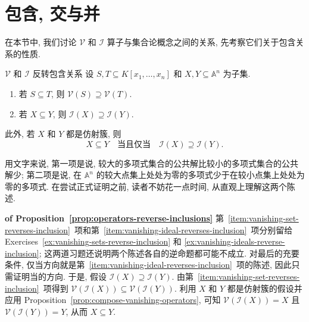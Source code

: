 \section{包含, 交与并}\label{sec:inclusions-intersections-unions}

在本节中, 我们讨论 $\mathcal{V}$ 和 $\mathcal{I}$ 算子与集合论概念之间的关系, 先考察它们关于包含关系的性质.

\begin{Proposition}{$\mathcal{V}$ 和 $\mathcal{I}$ 反转包含关系}\leavevmode\label{prop:operators-reverse-inclusions}
  设 $S,T\subseteq K[x_{1},\ldots,x_{n}]$ 和 $X,Y\subseteq\mathbb{A}^{n}$ 为子集.
  \begin{enumerate}[label=\arabic*.,ref=\arabic*]
    \item\label{item:vanishing-set-reverses-inclusion} 若 $S\subseteq T$, 则 $\mathcal{V}(S)\supseteq\mathcal{V}(T)$.
    \item\label{item:vanishing-ideal-reverses-inclusion} 若 $X\subseteq Y$, 则 $\mathcal{I}(X)\supseteq\mathcal{I}(Y)$.
  \end{enumerate}
  此外, 若 $X$ 和 $Y$ 都是仿射簇, 则
  \[
    X\subseteq Y \quad\text{当且仅当}\quad \mathcal{I}(X)\supseteq\mathcal{I}(Y).
  \]
\end{Proposition}

用文字来说, 第一项是说, 较大的多项式集合的公共解比较小的多项式集合的公共解少; 第二项是说, 在 $\mathbb{A}^{n}$ 的较大点集上处处为零的多项式少于在较小点集上处处为零的多项式. 在尝试正式证明之前, 读者不妨花一点时间, 从直观上理解这两个陈述.

\begin{Proof}\unskip\textbf{ of Proposition~\ref{prop:operators-reverse-inclusions}}\quad
  第~\ref{item:vanishing-set-reverses-inclusion}~项和第~\ref{item:vanishing-ideal-reverses-inclusion}~项分别留给 Exercises~\ref{ex:vanishing-sets-reverse-inclusion} 和 \ref{ex:vanishing-ideals-reverse-inclusion}; 这两道习题还说明两个陈述各自的逆命题都可能不成立. 对最后的充要条件, \textquotedbl{}仅当\textquotedbl{}方向就是第~\ref{item:vanishing-ideal-reverses-inclusion}~项的陈述, 因此只需证明\textquotedbl{}当\textquotedbl{}的方向. 于是, 假设 $\mathcal{I}(X)\supseteq\mathcal{I}(Y)$. 由第~\ref{item:vanishing-set-reverses-inclusion}~项得到 $\mathcal{V}(\mathcal{I}(X))\subseteq\mathcal{V}(\mathcal{I}(Y))$. 利用 $X$ 和 $Y$ 都是仿射簇的假设并应用 Proposition~\ref{prop:compose-vanishing-operators}, 可知 $\mathcal{V}(\mathcal{I}(X))=X$ 且 $\mathcal{V}(\mathcal{I}(Y))=Y$, 从而 $X\subseteq Y$.
\end{Proof}

